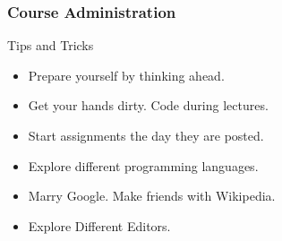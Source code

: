 \documentclass[10pt, compress]{beamer}
\begin{document}
\begin{frame}
	\frametitle{Course Administration}
	\begin{block}{Tips and Tricks}
		\begin{itemize}
			\item[] Prepare yourself by thinking ahead.
			\item[] Get your hands dirty. Code during lectures.
			\item[] Start assignments the day they are posted.
			\item[] Explore different programming languages.
			\item[] Marry Google. Make friends with Wikipedia.
			\item[] Explore Different Editors.
		\end{itemize}
	\end{block}
\end{frame}

\end{document}
